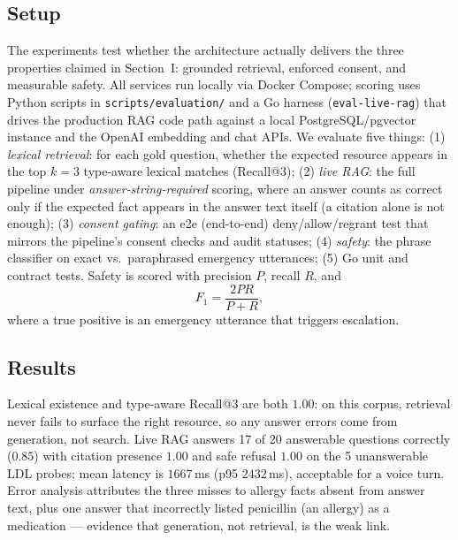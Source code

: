 \documentclass[conference]{IEEEtran}
\begin{document}
\subsection{Setup}
The experiments test whether the architecture actually delivers the three properties claimed in Section~I: grounded retrieval, enforced consent, and measurable safety.
All services run locally via Docker Compose; scoring uses Python scripts in \texttt{scripts/evaluation/} and a Go harness (\texttt{eval-live-rag}) that drives the production RAG code path against a local PostgreSQL/pgvector instance and the OpenAI embedding and chat APIs.
We evaluate five things:
(1) \emph{lexical retrieval}: for each gold question, whether the expected resource appears in the top $k{=}3$ type-aware lexical matches (Recall@3);
(2) \emph{live RAG}: the full pipeline under \emph{answer-string-required} scoring, where an answer counts as correct only if the expected fact appears in the answer text itself (a citation alone is not enough);
(3) \emph{consent gating}: an e2e (end-to-end) deny/allow/regrant test that mirrors the pipeline's consent checks and audit statuses;
(4) \emph{safety}: the phrase classifier on exact vs.\ paraphrased emergency utterances;
(5) Go unit and contract tests.
Safety is scored with precision $P$, recall $R$, and
\begin{equation}
F_1 = \frac{2PR}{P + R},
\end{equation}
where a true positive is an emergency utterance that triggers escalation.

\subsection{Results}
Lexical existence and type-aware Recall@3 are both $1.00$: on this corpus, retrieval never fails to surface the right resource, so any answer errors come from generation, not search.
Live RAG answers 17 of 20 answerable questions correctly ($0.85$) with citation presence $1.00$ and safe refusal $1.00$ on the 5 unanswerable LDL probes; mean latency is $1667$\,ms (p95 $2432$\,ms), acceptable for a voice turn.
Error analysis attributes the three misses to allergy facts absent from answer text, plus one answer that incorrectly listed penicillin (an allergy) as a medication --- evidence that generation, not retrieval, is the weak link.
\end{document}
